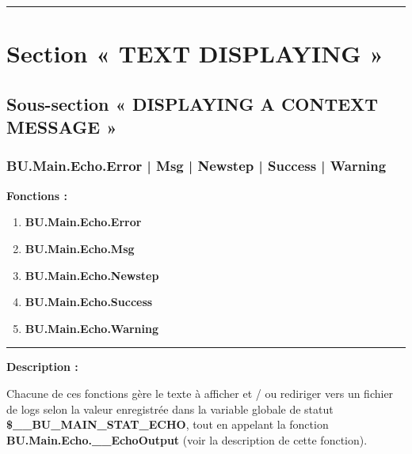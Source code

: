 \documentclass[a4paper,10pt]{article}
\begin{document}




    \color{sec1}\par\noindent\rule{\textwidth}{0.4pt}\color{text}

    \color{sec1}
    \section{Section « TEXT DISPLAYING »}\color{text}

    \color{sec2}
    \subsection{Sous-section « DISPLAYING A CONTEXT MESSAGE »}\color{text}

    \color{sec3}
    \subsubsection{BU.Main.Echo.Error | Msg | Newstep | Success | Warning}\color{text}

    \begin{justify}
        \textbf{Fonctions :}
        \begin{enumerate}
            \item \textbf{\color{red}BU.Main.Echo.Error}
            \item \textbf{\color{text}BU.Main.Echo.Msg}
            \item \textbf{\color{orange}BU.Main.Echo.Newstep}
            \item \textbf{\color{green}BU.Main.Echo.Success}
            \item \textbf{\color{yellow}BU.Main.Echo.Warning}
        \end{enumerate}
    \end{justify}


    \par\noindent\rule{\textwidth}{0.4pt}

    \begin{justify}
        \textbf{Description :}

        Chacune de ces fonctions gère le texte à afficher et / ou rediriger vers un fichier de logs selon la valeur enregistrée dans la variable globale de statut \textbf{\color{vars}\$\_\_BU\_MAIN\_STAT\_ECHO}, tout en appelant la fonction \textbf{\color{func}BU.Main.Echo.\_\_EchoOutput} (voir la description de cette fonction).
    \end{justify}
\end{document}
